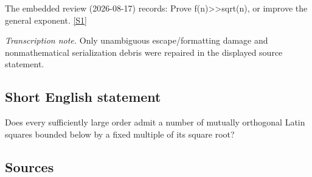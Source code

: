 \documentclass[11pt,a4paper]{article}
\newcommand{\sref}[2]{\hyperlink{source:#1:#2}{[S#2]}}
\begin{document}
The embedded review (2026-08-17) records: Prove f(n)>>sqrt(n), or improve the general exponent. \sref{2279}{1}

{\small\emph{Transcription note.} Only unambiguous escape/formatting damage and nonmathematical serialization debris were repaired in the displayed source statement.}

\subsection{Short English statement}

Does every sufficiently large order admit a number of mutually orthogonal Latin squares bounded below by a fixed multiple of its square root?

\subsection{Sources}
\end{document}

